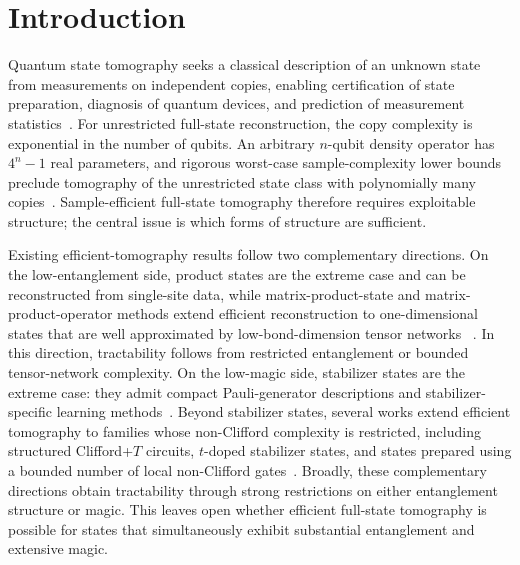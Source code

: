 \documentclass[
  aps,
  prx,
  reprint,
  superscriptaddress,
  amsmath,
  amssymb,
  nofootinbib,
  longbibliography
]{revtex4-2}
\begin{document}
\section{Introduction}
Quantum state tomography seeks a classical description of an unknown state
from measurements on independent copies, enabling certification of state
preparation, diagnosis of quantum devices, and prediction of
measurement statistics~\cite{ParisRehacek2004,AltepeterJamesKwiat2004}.  For
unrestricted full-state reconstruction, the copy complexity is exponential in
the number of qubits.  An arbitrary $n$-qubit density operator has
$4^n-1$ real parameters, and rigorous worst-case sample-complexity lower
bounds preclude tomography of the unrestricted state class with polynomially
many copies~\cite{haah2017sample,ODonnellWright2016}.  Sample-efficient
full-state tomography therefore requires exploitable structure; the central
issue is which forms of structure are sufficient.

Existing efficient-tomography results follow two complementary directions.  On
the low-entanglement side, product states are the extreme case and can be
reconstructed from single-site data, while matrix-product-state and
matrix-product-operator methods extend efficient reconstruction to one-dimensional
states that are well approximated by low-bond-dimension tensor networks
~\cite{Cramer2010Efficient,Baumgratz2013Scalable,Lanyon2017Efficient}.  In
this direction, tractability follows from restricted entanglement or bounded
tensor-network complexity.  On the low-magic
side, stabilizer states are the extreme case: they admit compact
Pauli-generator descriptions and stabilizer-specific learning
methods~\cite{AaronsonGottesman2004,Montanaro2017}.  
Beyond stabilizer states, several works extend efficient tomography to families whose non-Clifford complexity is restricted, including structured Clifford+$T$ circuits, $t$-doped stabilizer states, and states prepared using a bounded number of local non-Clifford gates~\cite{lai2022learning,leone2024,grewal2023efficient}.
Broadly, these complementary directions obtain tractability through strong restrictions on either entanglement structure or magic.
This leaves open whether efficient full-state tomography is possible for
states that simultaneously exhibit substantial entanglement and extensive magic.
\end{document}
